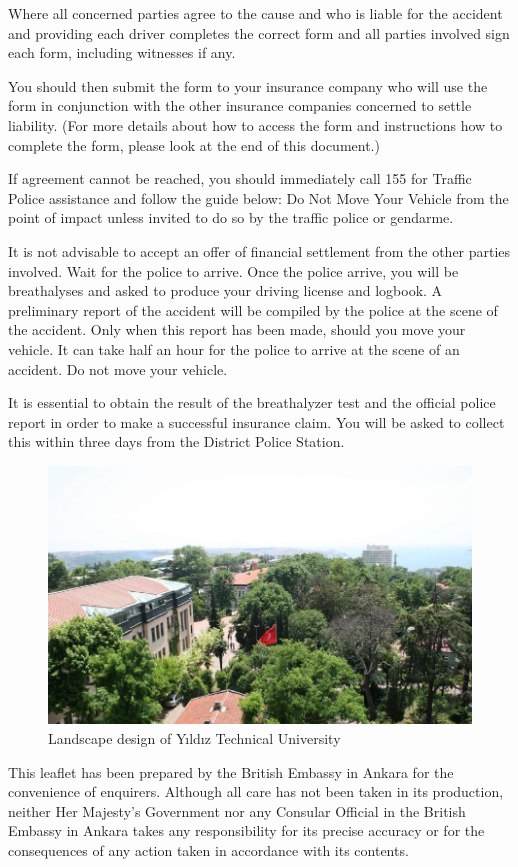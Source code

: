 Where all concerned parties agree to the cause and who is liable for the accident and providing each driver completes the correct form and all parties involved sign each form, including witnesses if any. 

You should then submit the form to your insurance company who will use the form in conjunction with the other insurance companies concerned to settle liability. (For more details about how to access the form and instructions how to complete the form, please look at the end of this document.) \cite{van2007experimental}

If agreement cannot be reached, you should immediately call 155 for Traffic Police assistance and follow the guide below:
Do Not Move Your Vehicle from the point of impact unless invited to do so by the traffic police or gendarme.

It is not advisable to accept an offer of financial settlement from the other parties involved. Wait for the police to arrive.
Once the police arrive, you will be breathalyses and asked to produce your driving license and logbook. A preliminary report of the accident will be compiled by the police at the scene of the accident. Only when this report has been made, should you move your vehicle.  It can take half an hour for the police to arrive at the scene of an accident. Do not move your vehicle.

It is essential to obtain the result of the breathalyzer test and the official police report in order to make a successful insurance claim. You will be asked to collect this within three days from the District Police Station.

\begin{figure}[!htbp]
\centering
\includegraphics[width=\textwidth]{projectChapters/images/Picture1.png}
\caption{Landscape design of Yıldız Technical University}
\label{fig:ornek5}
\end{figure}

This leaflet has been prepared by the British Embassy in Ankara for the convenience of enquirers.  Although all care has not been taken in its production, neither Her Majesty's Government nor any Consular Official in the British Embassy in Ankara takes any responsibility for its precise accuracy or for the consequences of any action taken in accordance with its contents.